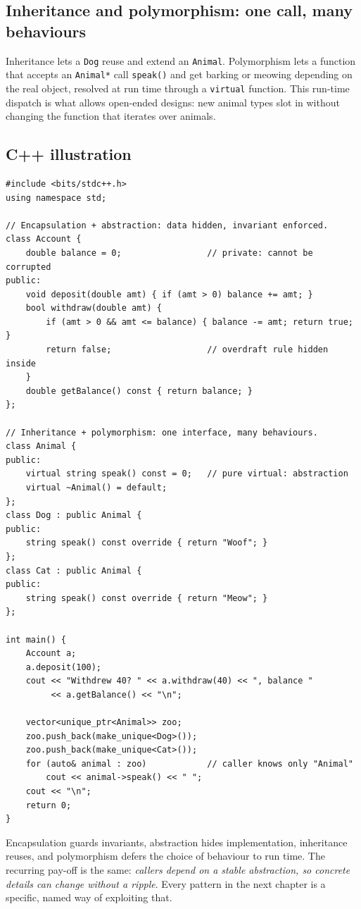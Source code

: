\subsection*{Inheritance and polymorphism: one call, many behaviours}

Inheritance lets a \texttt{Dog} reuse and extend an \texttt{Animal}.
Polymorphism lets a function that accepts an \texttt{Animal*} call
\texttt{speak()} and get barking or meowing depending on the real object,
resolved at run time through a \texttt{virtual} function. This run-time
dispatch is what allows open-ended designs: new animal types slot in
without changing the function that iterates over animals.

\subsection*{C++ illustration}

\begin{lstlisting}
#include <bits/stdc++.h>
using namespace std;

// Encapsulation + abstraction: data hidden, invariant enforced.
class Account {
    double balance = 0;                 // private: cannot be corrupted
public:
    void deposit(double amt) { if (amt > 0) balance += amt; }
    bool withdraw(double amt) {
        if (amt > 0 && amt <= balance) { balance -= amt; return true; }
        return false;                   // overdraft rule hidden inside
    }
    double getBalance() const { return balance; }
};

// Inheritance + polymorphism: one interface, many behaviours.
class Animal {
public:
    virtual string speak() const = 0;   // pure virtual: abstraction
    virtual ~Animal() = default;
};
class Dog : public Animal {
public:
    string speak() const override { return "Woof"; }
};
class Cat : public Animal {
public:
    string speak() const override { return "Meow"; }
};

int main() {
    Account a;
    a.deposit(100);
    cout << "Withdrew 40? " << a.withdraw(40) << ", balance "
         << a.getBalance() << "\n";

    vector<unique_ptr<Animal>> zoo;
    zoo.push_back(make_unique<Dog>());
    zoo.push_back(make_unique<Cat>());
    for (auto& animal : zoo)            // caller knows only "Animal"
        cout << animal->speak() << " ";
    cout << "\n";
    return 0;
}
\end{lstlisting}

\begin{takeawaybox}
Encapsulation guards invariants, abstraction hides implementation,
inheritance reuses, and polymorphism defers the choice of behaviour to run
time. The recurring pay-off is the same: \emph{callers depend on a stable
abstraction, so concrete details can change without a ripple}. Every
pattern in the next chapter is a specific, named way of exploiting that.
\end{takeawaybox}
